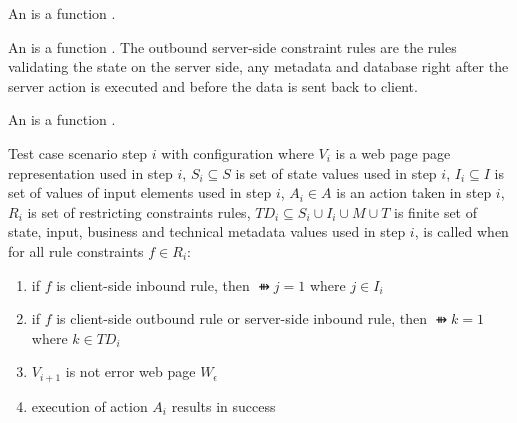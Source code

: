 \begin{defi}
An  is a function .
\cite{conf/fedcsis/FrajtakBJ12}
\end{defi}

\begin{defi}
An  is a function . The outbound server-side constraint rules are the rules validating the state on the server side, any metadata and database right after the server action is executed and before the data is sent back to client.
\cite{conf/fedcsis/FrajtakBJ12}
\end{defi}

\begin{defi}
An  is a function .
\cite{conf/fedcsis/FrajtakBJ12}
\end{defi}

\begin{defi}
Test case scenario step $i$ with configuration  where $V_i$ is a web page page representation used in step $i$, $S_i\subseteq S$ is set of state values used in step $i$, $I_i\subseteq I$ is set of values of input elements used in step $i$, $A_i\in A$ is an action taken in step $i$, $R_i$ is set of restricting constraints rules, $TD_i\subseteq S_i\cup I_i\cup M\cup T$ is finite set of state, input, business and technical metadata values used in step $i$, is called  when for all rule constraints $f \in R_i$:
\begin{enumerate}
 \item if $f$ is client-side inbound rule, then $\ffun{j}=1$ where $j\in I_i$
 \item if $f$ is client-side outbound rule or server-side inbound rule, then $\ffun{k}=1$ where $k \in TD_i$
 \item $V_{i+1}$ is not error web page $W_{\epsilon}$
 \item execution of action $A_i$ results in success
\end{enumerate}
\cite{conf/fedcsis/FrajtakBJ12}
\end{defi}

